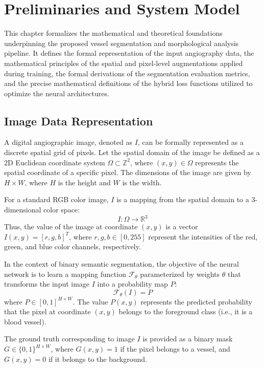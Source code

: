 \chapter{Preliminaries and System Model}
\label{ch:system_model}

This chapter formalizes the mathematical and theoretical foundations underpinning the proposed vessel segmentation and morphological analysis pipeline. It defines the formal representation of the input angiography data, the mathematical principles of the spatial and pixel-level augmentations applied during training, the formal derivations of the segmentation evaluation metrics, and the precise mathematical definitions of the hybrid loss functions utilized to optimize the neural architectures.

\section{Image Data Representation}
A digital angiographic image, denoted as $I$, can be formally represented as a discrete spatial grid of pixels. Let the spatial domain of the image be defined as a 2D Euclidean coordinate system $\Omega \subset \mathbb{Z}^2$, where $(x,y) \in \Omega$ represents the spatial coordinate of a specific pixel. The dimensions of the image are given by $H \times W$, where $H$ is the height and $W$ is the width.

For a standard RGB color image, $I$ is a mapping from the spatial domain to a 3-dimensional color space:
\begin{equation}
    I: \Omega \rightarrow \mathbb{R}^3
\end{equation}
Thus, the value of the image at coordinate $(x,y)$ is a vector $I(x,y) = [r, g, b]^T$, where $r, g, b \in [0, 255]$ represent the intensities of the red, green, and blue color channels, respectively.

In the context of binary semantic segmentation, the objective of the neural network is to learn a mapping function $\mathcal{F}_\theta$ parameterized by weights $\theta$ that transforms the input image $I$ into a probability map $P$:
\begin{equation}
    \mathcal{F}_\theta(I) = P
\end{equation}
where $P \in [0,1]^{H \times W}$. The value $P(x,y)$ represents the predicted probability that the pixel at coordinate $(x,y)$ belongs to the foreground class (i.e., it is a blood vessel).

The ground truth corresponding to image $I$ is provided as a binary mask $G \in \{0,1\}^{H \times W}$, where $G(x,y) = 1$ if the pixel belongs to a vessel, and $G(x,y) = 0$ if it belongs to the background.

